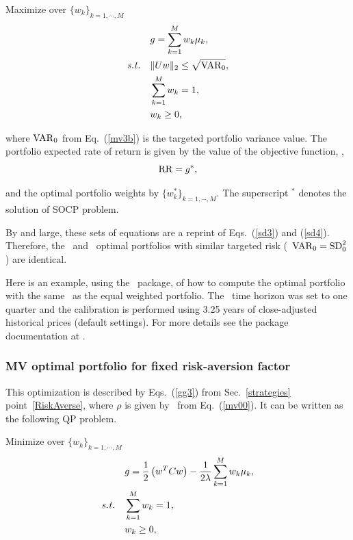 \bigskip
\noindent Maximize over $\{ w_k \}_{k=1,\cdots, M}$
\begin{subequations}\label{mv3}
\begin{align}
    & g = \sum_{k=1}^M w_k \mu_k, \label{mv3a} \\
    \st & \| U w\|_2 \leq \sqrt{\VAR_0}, \label{mv3b} \\
        & \sum_{k=1}^M w_k = 1, \label{mv3c} \\
        & w_k \geq 0, \label{mv3d}
\end{align}
\end{subequations}

\noindent where ${\rm VAR}_0$ from Eq.~(\ref{mv3b}) is the targeted portfolio variance value.
The portfolio expected rate of return is given by the value of the objective
function, \ie,
\begin{equation}
    \RR = g^*, \label{mv4}
\end{equation}

\noindent and the optimal portfolio weights by $\{w^*_k\}_{k=1,\cdots,M}$. The superscript $^*$ denotes the
solution of SOCP problem.

By and large, these sets of equations are a reprint of Eqs.~(\ref{sd3}) and (\ref{sd4}).
Therefore, the \MV\ and \SD\ optimal portfolios with similar targeted risk (\ie\ ${\rm VAR}_0 = {\rm SD}_0^2$) are identical.

\bigskip
\noindent Here is an example, using the \azapy\ package, of how to compute the optimal portfolio
with the same \VAR\ as the equal weighted portfolio.
The \VAR\ time horizon was set to one quarter and the calibration is performed using 3.25 years of
close-adjusted historical prices (default settings).
For more details see the package documentation at \azapydoc.



\BackToContents


\subsubsection{MV optimal portfolio for fixed risk-aversion factor}
This optimization is described by Eqs.~(\ref{gg3}) from Sec.~\ref{strategies} point~\ref{RiskAverse},
where $\rho$ is given by \VAR\ from Eq.\ (\ref{mv00}).
It can be written as the following QP problem.

\bigskip
\noindent Minimize over $\{ w_k \}_{k=1,\cdots,M}$
\begin{subequations}\label{mv5}
\begin{align}
    & g = \frac{1}{2}\left( w^T C w \right) - \frac{1}{2\lambda} \sum_{k=1}^M w_k \mu_k, \label{mv5a} \\
    \st & \sum_{k=1}^M w_k =1, \label{mv5b} \\
        & w_k \geq 0, \label{mv5c}
\end{align}
\end{subequations}

